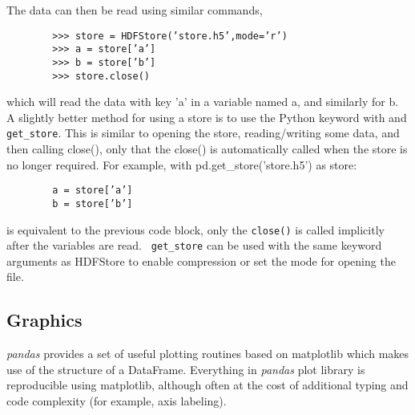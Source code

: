 \documentclass[KSmain.tex]{subfiles}
\begin{document}
		The data can then be read using similar commands,
		\begin{framed}
			\begin{verbatim}
		>>> store = HDFStore(’store.h5’,mode=’r’)
		>>> a = store[’a’]
		>>> b = store[’b’]
		>>> store.close()
			\end{verbatim}
		\end{framed}
		which will read the data with key ’a’ in a variable named a, and similarly for b.
		A slightly better method for using a store is to use the Python keyword with and \texttt{get\_store}. This is
		similar to opening the store, reading/writing some data, and then calling close(), only that the close()
		is automatically called when the store is no longer required. For example,
		with pd.get\_store(’store.h5’) as store:
		\begin{framed}
			\begin{verbatim}
		a = store[’a’]
		b = store[’b’]
	\end{verbatim}
	\end{framed}
		is equivalent to the previous code block, only the \texttt{close()} is called implicitly after the variables are read.
	\texttt{	get\_store} can be used with the same keyword arguments as HDFStore to enable compression or set the
		mode for opening the file.
	\newpage
	\subsection{Graphics}
	\textit{pandas} provides a set of useful plotting routines based on matplotlib which makes use of the structure
	of a DataFrame. Everything in \textit{pandas} plot library is reproducible using matplotlib, although often at the
	cost of additional typing and code complexity (for example, axis labeling).
	
\end{document}
